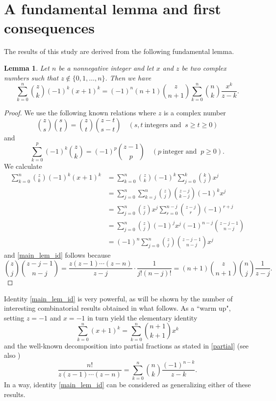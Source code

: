 \documentclass[11pt,reqno]{amsart}
\theoremstyle{plain}
\numberwithin{equation}{section}
\newtheorem{lemma}[thm]{Lemma}
\begin{document}
\section{A fundamental lemma and first consequences}

The results of this study are derived from the following fundamental lemma.

\begin{lemma}
Let $n$ be a nonnegative integer and let $x$ and $z$ be two complex numbers such that $z\notin\{0,1,\ldots,n\}$. Then we have
\begin{equation}\label{main_lem_id}
\sum_{k=0}^n \binom{z}{k} (-1)^k (x+1)^k = (-1)^n (n+1)\binom{z}{n+1} \sum_{k=0}^n \binom{n}{k} \frac{x^k}{z-k}.
\end{equation}
\end{lemma}
\begin{proof}
We use the following known relations where $z$ is a complex number 
\[\binom{z}{s}\binom{s}{t}=\binom{z}{t}\binom{z-t}{s-t}\quad (s,t \ \mbox{integers and } \ s\ge t\ge 0)\]
and
\[\sum_{k=0}^p(-1)^k\binom{z}{k}=(-1)^p\binom{z-1}{p}\quad (p\ \mbox{integer and }\ p\ge 0).\]
We calculate
\begin{align*}
\sum_{k=0}^n \binom{z}{k} (-1)^k (x+1)^k &= \sum_{k=0}^n \binom{z}{k} (-1)^k \sum_{j=0}^k \binom{k}{j} x^j \\
&= \sum_{j=0}^n \sum_{k=j}^n \binom{z}{j} \binom{z-j}{k-j} (-1)^k x^j \\
&= \sum_{j=0}^n \binom{z}{j} x^j \sum_{r=0}^{n-j} \binom{z-j}{r} (-1)^{r+j} \\
&= \sum_{j=0}^n \binom{z}{j} (-1)^j x^j (-1)^{n-j} \binom{z-j-1}{n-j} \\
&= (-1)^n \sum_{j=0}^n \binom{z}{j} \binom{z-j-1}{n-j} x^j
\end{align*}
and \eqref{main_lem_id} follows because
\[\binom{z}{j} \binom{z-j-1}{n-j} = \frac{z(z-1)\cdots(z-n)}{z-j}\cdot\frac{1}{j!(n-j)!} = (n+1)\binom{z}{n+1}\binom{n}{j}\frac{1}{z-j}.\]
\end{proof}

Identity \eqref{main_lem_id} is very powerful, as will be shown by the number of interesting combinatorial results obtained in what follows.
As a ``warm up", setting $z=-1$ and $x=-1$ in turn yield the elementary identity
$$\sum_{k=0}^n (x+1)^k = \sum_{k=0}^n \binom{n+1}{k+1} x^k$$
and the well-known decomposition into partial fractions as stated in \eqref{partial} (see also \cite{Boyadzhiev})
\begin{equation}\label{eq_9} 
\frac{ n!}{z(z-1)\cdots (z-n)} = \sum_{k=0}^n \binom{n}{k} \frac{(-1)^{n-k}}{z-k}.
\end{equation}
In a way, identity \eqref{main_lem_id} can be considered as generalizing either of these results.\\[0.3cm]
\end{document}
